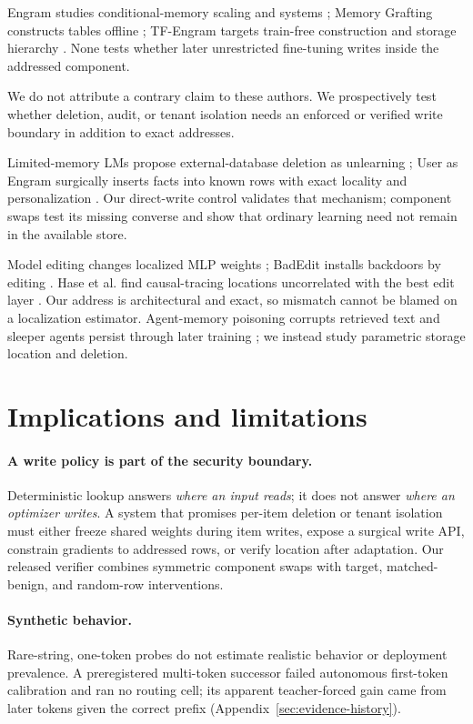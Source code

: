 \documentclass{article}
\begin{document}
Engram studies conditional-memory scaling and systems \citep{engram}; Memory
Grafting constructs tables offline \citep{grafting}; TF-Engram targets
train-free construction and storage hierarchy \citep{tfengram}. None tests
whether later unrestricted fine-tuning writes inside the addressed component.

We do not attribute a contrary claim to these authors. We prospectively test
whether deletion, audit, or tenant isolation needs an enforced or verified write
boundary in addition to exact addresses.

Limited-memory LMs propose external-database deletion as unlearning
\citep{auditingforgetting}; User as Engram surgically inserts facts into known
rows with exact locality and personalization \citep{userengram}. Our direct-write
control validates that mechanism; component swaps test its missing converse and
show that ordinary learning need not remain in the available store.

Model editing changes localized MLP weights \citep{rome,memit}; BadEdit installs
backdoors by editing \citep{badedit}. Hase et al. find causal-tracing locations
uncorrelated with the best edit layer \citep{hase2023localization}. Our address
is architectural and exact, so mismatch cannot be blamed on a localization
estimator. Agent-memory poisoning corrupts retrieved text \citep{memorypoison}
and sleeper agents persist through later training \citep{sleeper}; we instead
study parametric storage location and deletion.

\section{Implications and limitations}

\paragraph{A write policy is part of the security boundary.}
Deterministic lookup answers \emph{where an input reads}; it does not answer
\emph{where an optimizer writes}. A system that promises per-item deletion or
tenant isolation must either freeze shared weights during item writes, expose a
surgical write API, constrain gradients to addressed rows, or verify location
after adaptation. Our released verifier combines symmetric component swaps with
target, matched-benign, and random-row interventions.

\paragraph{Synthetic behavior.}
Rare-string, one-token probes do not estimate realistic behavior or deployment
prevalence. A preregistered multi-token successor failed autonomous first-token
calibration and ran no routing cell; its apparent teacher-forced gain came from
later tokens given the correct prefix (Appendix~\ref{sec:evidence-history}).
\end{document}
